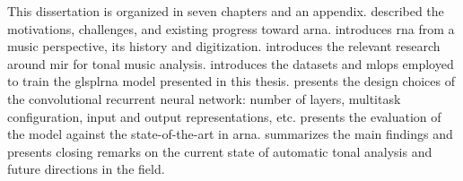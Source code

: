 
This dissertation is organized in seven chapters and an
appendix.  described the motivations,
challenges, and existing progress toward \gls{arna}.
 introduces
\gls{rna} from a music perspective, its history and
digitization.  introduces the relevant
research around \gls{mir} for tonal music analysis.
 introduces the
datasets and \gls{mlops} employed to train the glspl{rna}
model presented in this thesis. 
presents the design choices of the convolutional recurrent
neural network: number of layers, multitask configuration,
input and output representations, etc.
 presents the evaluation of
the model against the state-of-the-art in \gls{arna}.
 summarizes the main findings and
presents closing remarks on the current state of automatic
tonal analysis and future directions in the field.

